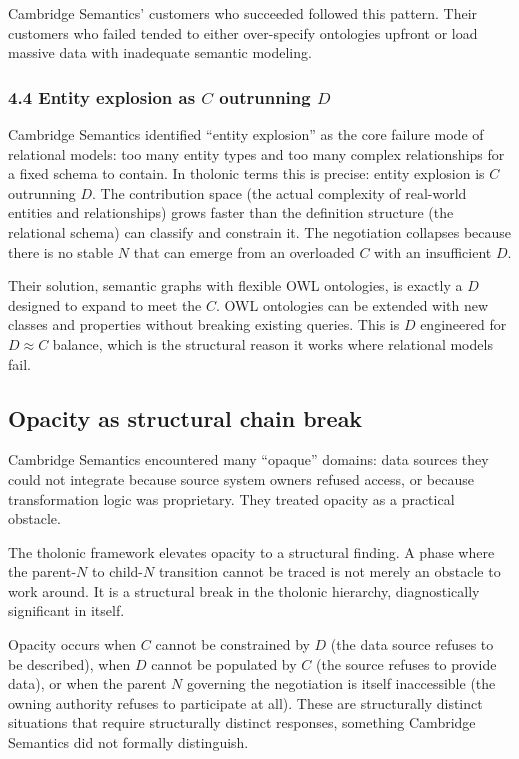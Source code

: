 \documentclass[12pt]{article}
\begin{document}
Cambridge Semantics' customers who succeeded followed this pattern.
Their customers who failed tended to either over-specify ontologies
upfront or load massive data with inadequate semantic modeling.

\subsubsection{\texorpdfstring{4.4 Entity explosion as \(C\) outrunning
\(D\)}{4.4 Entity explosion as C outrunning D}}\label{entity-explosion-as-c-outrunning-d}

Cambridge Semantics identified ``entity explosion'' as the core failure
mode of relational models: too many entity types and too many complex
relationships for a fixed schema to contain. In tholonic terms this is
precise: entity explosion is \(C\) outrunning \(D\). The contribution
space (the actual complexity of real-world entities and relationships)
grows faster than the definition structure (the relational schema) can
classify and constrain it. The negotiation collapses because there is no
stable \(N\) that can emerge from an overloaded \(C\) with an
insufficient \(D\).

Their solution, semantic graphs with flexible OWL ontologies, is exactly
a \(D\) designed to expand to meet the \(C\). OWL ontologies can be
extended with new classes and properties without breaking existing
queries. This is \(D\) engineered for \(D \approx C\) balance, which is
the structural reason it works where relational models fail.

\subsection{Opacity as structural chain break}\label{opacity-as-structural-chain-break}

Cambridge Semantics encountered many ``opaque'' domains: data sources
they could not integrate because source system owners refused access, or
because transformation logic was proprietary. They treated opacity as a
practical obstacle.

The tholonic framework elevates opacity to a structural finding. A phase
where the parent-\(N\) to child-\(N\) transition cannot be traced is not
merely an obstacle to work around. It is a structural break in the
tholonic hierarchy, diagnostically significant in itself.

Opacity occurs when \(C\) cannot be constrained by \(D\) (the data
source refuses to be described), when \(D\) cannot be populated by \(C\)
(the source refuses to provide data), or when the parent \(N\) governing
the negotiation is itself inaccessible (the owning authority refuses to
participate at all). These are structurally distinct situations that
require structurally distinct responses, something Cambridge Semantics
did not formally distinguish.
\end{document}
